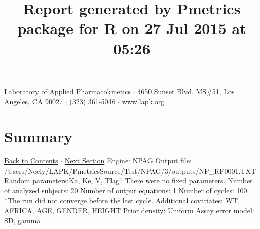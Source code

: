 \documentclass{article}
\title{Report generated by Pmetrics package for R on 27 Jul 2015 at 05:26 }
\date{}
\begin{document}
              \maketitle 
Laboratory of Applied Pharmacokinetics $\cdot$ 4650 Sunset Blvd. MS\#51, Los Angeles, CA 90027 $\cdot$ (323) 361-5046 $\cdot$ \href{http://www.lapk.org}{www.lapk.org} 
\hypertarget{tableofcontents}{}
        \tableofcontents
        \newpage 
\section{Summary} \hyperlink{tableofcontents}{Back to Contents} $\cdot$ \hyperlink{cycleinfo}{Next Section}\newline
 \newline 
Engine: NPAG\newline 
Output file: /Users/Neely/LAPK/PmetricsSource/Test/NPAG/3/outputs/NP\_RF0001.TXT\newline 
Random parameters:Ka, Ke, V, Tlag1\newline 
There were no fixed parameters. \newline 
Number of analyzed subjects:  20 \newline 
Number of output equations:  1 \newline 
Number of cycles:  100     *The run did not converge before the last cycle. \newline 
Additional covariates:  WT, AFRICA, AGE, GENDER, HEIGHT \newline 
Prior density: Uniform \newline Assay error model: SD, gamma \newline  \newline 
\newpage
            \hypertarget{cycleinfo}{}
            
\end{document}
